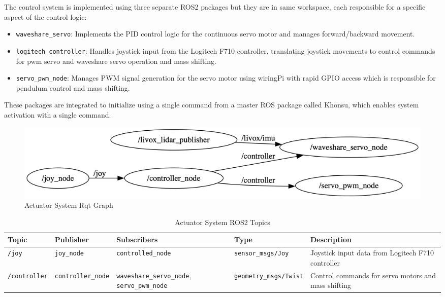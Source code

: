 \documentclass[english, bachelor, utf8]{base/thesis_telematics}
\begin{document}
The control system is implemented using three separate ROS2 packages but they are in same workspace, each responsible for a specific aspect of the control logic:
\begin{itemize}
    \item \texttt{waveshare\_servo}: Implements the PID control logic for the continuous servo motor and manages forward/backward movement.
    \item \texttt{logitech\_controller}: Handles joystick input from the Logitech F710 controller, translating joystick movements to control commands for pwm servo and waveshare servo operation and mass shifting.
    \item \texttt{servo\_pwm\_node}: Manages PWM signal generation for the servo motor using wiringPi with rapid GPIO access which is responsible for pendulum control and mass shifting.
\end{itemize} 
These packages are integrated to initialize using a single command from a master ROS package called Khonsu, which enables system activation with a single command.

\begin{figure}[H]
    \centering
    \includegraphics[width=\textwidth]{pics/rqt/ros_actuator.png}
    \caption{Actuator System Rqt Graph}
    \label{fig:ros_actuator}
\end{figure}

\begin{table}[H]
\centering
\caption{Actuator System ROS2 Topics}
\label{tab:actuator_topics}
\scriptsize
\begin{tabularx}{\textwidth}{@{}llXlX@{}}
\toprule
\textbf{Topic} & \textbf{Publisher} & \textbf{Subscribers} & \textbf{Type} & \textbf{Description} \\
\midrule
\texttt{/joy} & \texttt{joy\_node} & \texttt{controlled\_node} & \texttt{sensor\_msgs/Joy} & Joystick input data from Logitech F710 controller \\[0.3em]
\texttt{/controller} & \texttt{controller\_node} & \texttt{waveshare\_servo\_node}, \texttt{servo\_pwm\_node} & \texttt{geometry\_msgs/Twist} & Control commands for servo motors and mass shifting \\
\bottomrule
\end{tabularx}
\end{table}
\end{document}
